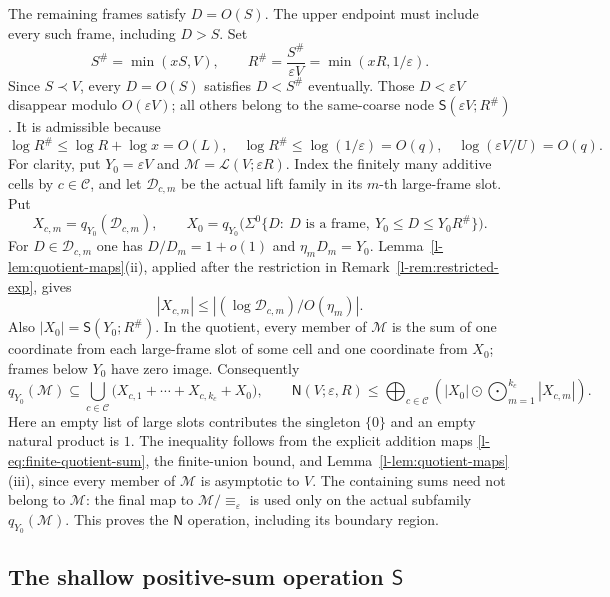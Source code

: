 \documentclass[11pt]{article}
\theoremstyle{definition}
\theoremstyle{remark}
\newcommand{\od}{\mathbin{\odot}}
\newcommand{\NN}{\mathsf N}
\newcommand{\SSS}{\mathsf S}
\newcommand{\calL}{\mathcal L}
\numberwithin{equation}{section}
\begin{document}
The remaining frames satisfy $D=O(S)$.
The upper endpoint must include every such frame, including $D>S$.
Set
\begin{equation}
 S^\#=\min(xS,V),\qquad
 R^\#=\frac{S^\#}{\varepsilon V}
                  =\min(xR,1/\varepsilon).
 \label{l-eq-6.11}
\end{equation}
Since $S\prec V$, every $D=O(S)$ satisfies $D<S^\#$ eventually.
Those $D<\varepsilon V$ disappear modulo $O(\varepsilon V)$;
all others belong to the same-coarse node
$\SSS(\varepsilon V;R^\#)$.
It is admissible because
\[
 \log R^\#\le\log R+\log x=O(L),\quad
 \log R^\#\le\log(1/\varepsilon)=O(q),\quad
 \log(\varepsilon V/U)=O(q).
\]
For clarity, put $Y_0=\varepsilon V$ and
$\mathcal M=\calL(V;\varepsilon R)$.  Index the finitely many
additive cells by $c\in\mathcal C$, and let
$\mathcal D_{c,m}$ be the actual lift family in its $m$-th
large-frame slot.  Put
\[
 X_{c,m}=q_{Y_0}(\mathcal D_{c,m}),\qquad
 X_0=q_{Y_0}\bigl(\Sigma^0\{D:\ D\text{ is a frame},\
                                      Y_0\le D\le Y_0R^\#\}\bigr).
\]
For $D\in\mathcal D_{c,m}$ one has $D/D_m=1+o(1)$ and
$\eta_mD_m=Y_0$.  Lemma~\ref{l-lem:quotient-maps}(ii), applied
after the restriction in Remark~\ref{l-rem:restricted-exp}, gives
\[
 |X_{c,m}|\le |(\log\mathcal D_{c,m})/O(\eta_m)|.
\]
Also $|X_0|=\SSS(Y_0;R^\#)$.  In the quotient, every member of
$\mathcal M$ is the sum of one coordinate from each large-frame
slot of some cell and one coordinate from $X_0$; frames below
$Y_0$ have zero image.  Consequently
\begin{equation}
 q_{Y_0}(\mathcal M)\subseteq
 \bigcup_{c\in\mathcal C}
 \bigl(X_{c,1}+\cdots+X_{c,k_c}+X_0\bigr),\qquad
 \NN(V;\varepsilon,R)
 \le\bigoplus_{c\in\mathcal C}
       \left(|X_0|\od\bigodot_{m=1}^{k_c}|X_{c,m}|\right).
 \label{l-eq:N-assembly}
\end{equation}
Here an empty list of large slots contributes the singleton
$\{0\}$ and an empty natural product is $1$.
The inequality follows from the explicit addition maps
\eqref{l-eq:finite-quotient-sum}, the finite-union bound, and
Lemma~\ref{l-lem:quotient-maps}(iii), since every member of
$\mathcal M$ is asymptotic to $V$.  The containing sums need not
belong to $\mathcal M$: the final map to
$\mathcal M/{\equiv_\varepsilon}$ is used only on the actual
subfamily $q_{Y_0}(\mathcal M)$.  This proves the $\NN$
operation, including its boundary region.

\subsection{The shallow positive-sum operation \texorpdfstring{$\SSS$}{S}}\label{l-sec:S}
\end{document}
